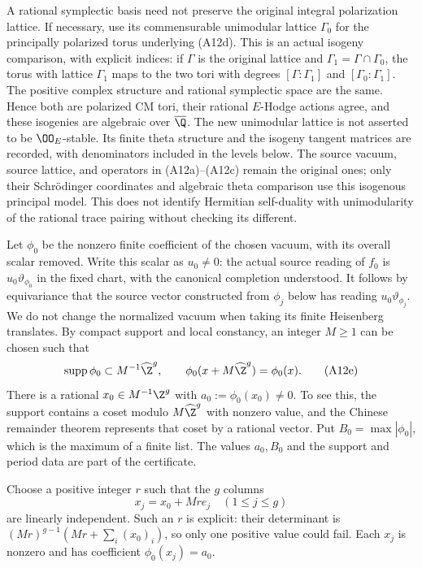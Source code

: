 A rational symplectic basis need not preserve the original
integral polarization lattice.  If necessary, use its
commensurable unimodular lattice $\Gamma_0$ for the
principally polarized torus underlying (A12d).  This is
an actual isogeny comparison, with explicit indices:
if $\Gamma$ is the original lattice and
$\Gamma_1=\Gamma\cap\Gamma_0$, the torus with lattice
$\Gamma_1$ maps to the two tori with degrees
$[\Gamma:\Gamma_1]$ and $[\Gamma_0:\Gamma_1]$.
The positive complex structure and rational symplectic
space are the same.  Hence both are polarized CM tori,
their rational $E$-Hodge actions agree, and these isogenies
are algebraic over $\overline\Q$.  The new unimodular
lattice is not asserted to be $\OO_E$-stable.  Its finite
theta structure and the isogeny tangent matrices are
recorded, with denominators included in the levels below.
The source vacuum, source lattice, and operators in
(A12a)--(A12c) remain the original ones; only their
Schr\"odinger coordinates and algebraic theta comparison
use this isogenous principal model.  This does not
identify Hermitian self-duality with unimodularity of
the rational trace pairing without checking its different.

Let $\phi_0$ be the nonzero finite coefficient of the chosen
vacuum, with its overall scalar removed.  Write this scalar
as $u_0\ne0$: the actual source reading of $f_0$ is
$u_0\vartheta_{\phi_0}$ in the fixed chart, with the
canonical completion understood.  It follows by equivariance
that the source vector constructed from $\phi_j$ below has
reading $u_0\vartheta_{\phi_j}$.  We do not change the
normalized vacuum when taking its finite Heisenberg translates.
By compact support
and local constancy, an integer $M\geq1$ can be chosen such
that
\[
 \operatorname{supp}\phi_0\subset M^{-1}\widehat\Z^g,
 \qquad \phi_0(x+M\widehat\Z^g)=\phi_0(x).
 \tag{A12e}
\]
There is a rational $x_0\in M^{-1}\Z^g$ with
$a_0:=\phi_0(x_0)\ne0$.  To see this, the support contains
a coset modulo $M\widehat\Z^g$ with nonzero value, and
the Chinese remainder theorem represents that coset by
a rational vector.  Put $B_0=\max|\phi_0|$, which is the
maximum of a finite list.  The values $a_0,B_0$ and the
support and period data are part of the certificate.

Choose a positive integer $r$ such that the $g$ columns
\[
                    x_j=x_0+Mr e_j\quad(1\leq j\leq g)
 \tag{A12f}
\]
are linearly independent.  Such an $r$ is explicit: their
determinant is
$(Mr)^{g-1}(Mr+\sum_i(x_0)_i)$, so only one positive
value could fail.  Each $x_j$ is nonzero and has coefficient
$\phi_0(x_j)=a_0$.

